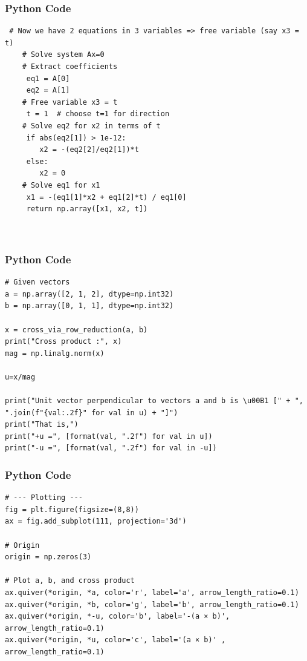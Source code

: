 \documentclass{beamer}
\begin{document}
\begin{frame}[fragile]
    \frametitle{Python Code}
    \begin{lstlisting}
 # Now we have 2 equations in 3 variables => free variable (say x3 = t)
    # Solve system Ax=0
    # Extract coefficients
     eq1 = A[0]
     eq2 = A[1]
    # Free variable x3 = t
     t = 1  # choose t=1 for direction
    # Solve eq2 for x2 in terms of t
     if abs(eq2[1]) > 1e-12:
        x2 = -(eq2[2]/eq2[1])*t
     else:
        x2 = 0
    # Solve eq1 for x1
     x1 = -(eq1[1]*x2 + eq1[2]*t) / eq1[0]
     return np.array([x1, x2, t])



    \end{lstlisting}
\end{frame}

\begin{frame}[fragile]
    \frametitle{Python Code}
    \begin{lstlisting}
# Given vectors
a = np.array([2, 1, 2], dtype=np.int32)
b = np.array([0, 1, 1], dtype=np.int32)

x = cross_via_row_reduction(a, b)
print("Cross product :", x)
mag = np.linalg.norm(x)

u=x/mag

print("Unit vector perpendicular to vectors a and b is \u00B1 [" + ", ".join(f"{val:.2f}" for val in u) + "]")
print("That is,")
print("+u =", [format(val, ".2f") for val in u])
print("-u =", [format(val, ".2f") for val in -u])

    \end{lstlisting}
\end{frame}

\begin{frame}[fragile]
    \frametitle{Python Code}
    \begin{lstlisting}
# --- Plotting ---
fig = plt.figure(figsize=(8,8))
ax = fig.add_subplot(111, projection='3d')

# Origin
origin = np.zeros(3)

# Plot a, b, and cross product
ax.quiver(*origin, *a, color='r', label='a', arrow_length_ratio=0.1)
ax.quiver(*origin, *b, color='g', label='b', arrow_length_ratio=0.1)
ax.quiver(*origin, *-u, color='b', label='-(a × b)', arrow_length_ratio=0.1)
ax.quiver(*origin, *u, color='c', label='(a × b)' , arrow_length_ratio=0.1) 
    \end{lstlisting}
\end{frame}
\end{document}
